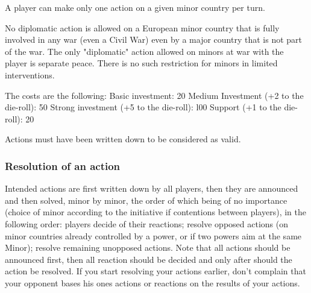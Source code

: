 \aparag A player can make only one action on a given minor country per turn.

\aparag No diplomatic action is allowed on a European minor country that is
fully involved in any war (even a Civil War) even by a major country that is
not part of the war. The only "diplomatic" action allowed on minors at war
with the player is separate peace. There is no such restriction for minors in
limited interventions.

The costs are the following:
\bparag Basic investment: 20 \ducats
\bparag Medium Investment (+2 to the die-roll): 50 \ducats
\bparag Strong investment (+5 to the die-roll): l00 \ducats
\bparag Support (+1 to the die-roll): 20 \ducats

\aparag Actions must have been written down to be considered as valid.


\subsubsection{Resolution of an action}
 Intended actions are first written down by all
players, then they are announced and then solved, minor by minor, the order of
which being of no importance (choice of minor according to the initiative if
contentions between players), in the following order:
\bparag players decide of their reactions;
\bparag resolve opposed actions (on minor countries already controlled by a
power, or if two powers aim at the same Minor);
\bparag resolve remaining unopposed actions.
\bparag Note that all actions should be announced first, then all reaction
should be decided and only after should the action be resolved. If you start
resolving your actions earlier, don't complain that your opponent bases his
ones actions or reactions on the results of your actions.

